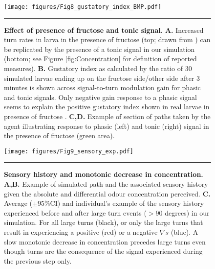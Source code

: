 \documentclass[11pt,a4paper]{article}
\newcommand{\todoBW}[1]{\todo[author=BW,color=orange, size=\tiny,inline]{#1}}
\begin{document}
\begin{figure}
\begin{center}
\texttt{[image: figures/Fig8\_gustatory\_index\_BMP.pdf]}
\caption{{\bf Effect of presence of fructose and tonic signal.}
{\bf A.} Increased turn rates in larva in the presence of fructose (top; drawn from \citep{schleyer2015learning}) can be replicated by the presence of a tonic signal in our simulation (bottom; see Figure \ref{fig:Concentration} for definition of reported measures). 
{\bf B.} Gustatory index as calculated by the ratio of 30 simulated larvae ending up on the fructose side/other side after 3 minutes is shown across signal-to-turn modulation gain for phasic and tonic signals. Only negative gain response to a phasic signal seems to explain the positive gustatory index shown in real larvae in presence of fructose \citep{schleyer2011behavior}.
{\bf C,D.} Example of section of paths taken by the agent illustrating response to phasic (left) and tonic (right) signal in the presence of fructose (green area).
\label{fig:Tonic}}
\hrule
\end{center}
\end{figure}


\begin{figure}
\begin{center}
\texttt{[image: figures/Fig9\_sensory\_exp.pdf]}
\caption{{\bf Sensory history and monotonic decrease in concentration.} {\bf A,B.} Example of simulated path and the associated sensory history given the absolute and differential odour concentration perceived.
{\bf  C.} Average ($\pm 95\%$CI) and individual’s example of the sensory history experienced before and after large turn events ($>90$ degrees) in our simulation. For all large turns (black), or only the large turns that result in experiencing a positive (red) or a negative $\nabla s$ (blue). A slow monotonic decrease in concentration precedes large turns even though turns are the consequence of the signal experienced during the previous step only.
\label{fig:SensoryHistory}}
\hrule
\end{center}
\end{figure}
\end{document}
